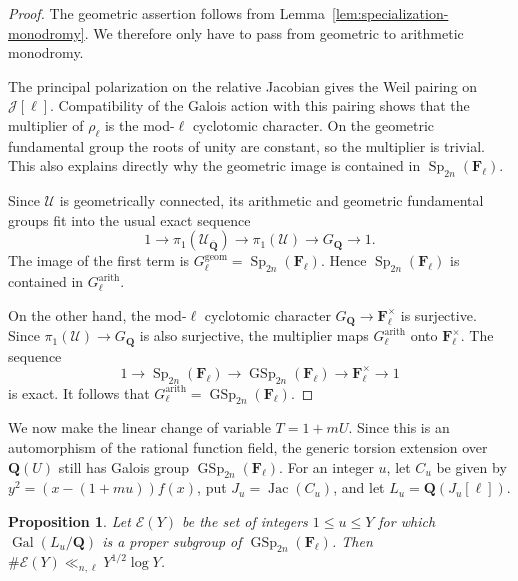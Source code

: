 \documentclass[11pt,hidelinks]{amsart}
\newtheorem{proposition}[theorem]{Proposition}
\newcommand{\Q}{\mathbf Q}
\newcommand{\F}{\mathbf F}
\newcommand{\Gal}{\operatorname{Gal}}
\newcommand{\GSp}{\operatorname{GSp}}
\newcommand{\Sp}{\operatorname{Sp}}
\newcommand{\Jac}{\operatorname{Jac}}
\begin{document}
\begin{proof}
The geometric assertion follows from
Lemma~\ref{lem:specialization-monodromy}.  We therefore only have to pass
from geometric to arithmetic monodromy.

The principal polarization on the relative Jacobian gives the Weil
pairing on $\mathcal J[\ell]$.  Compatibility of the Galois action
with this pairing shows that the multiplier of $\rho_\ell$ is the
mod-$\ell$ cyclotomic character.  On the geometric fundamental group
the roots of unity are constant, so the multiplier is trivial.  This
also explains directly why the geometric image is contained in
$\Sp_{2n}(\F_\ell)$.

Since $\mathcal U$ is geometrically connected, its arithmetic and
geometric fundamental groups fit into the usual exact sequence
\[
1\longrightarrow
\pi_1(\mathcal U_{\overline{\Q}})
\longrightarrow
\pi_1(\mathcal U)
\longrightarrow
G_\Q
\longrightarrow1.
\]
The image of the first term is
$G^{\mathrm{geom}}_\ell=\Sp_{2n}(\F_\ell)$.  Hence
$\Sp_{2n}(\F_\ell)$ is contained in
$G^{\mathrm{arith}}_\ell$.

On the other hand, the mod-$\ell$ cyclotomic character
$G_\Q\rightarrow\F_\ell^\times$ is surjective.  Since
$\pi_1(\mathcal U)\rightarrow G_\Q$ is also surjective, the multiplier
maps $G^{\mathrm{arith}}_\ell$ onto $\F_\ell^\times$. The 
sequence
\[
1\longrightarrow
\Sp_{2n}(\F_\ell)
\longrightarrow
\GSp_{2n}(\F_\ell)
\longrightarrow
\F_\ell^\times
\longrightarrow1
\]
is exact.  It follows that
$G^{\mathrm{arith}}_\ell=\GSp_{2n}(\F_\ell)$.
\end{proof}



We now make the linear change of variable $T=1+mU$. Since this is an automorphism of the rational function field, the generic torsion extension over $\Q(U)$ still has Galois group $\GSp_{2n}(\F_\ell)$. For an integer $u$, let $C_u$ be given by $y^2=(x-(1+mu))f(x)$, put $J_u=\Jac(C_u)$, and let $L_u=\Q(J_u[\ell])$.

\begin{proposition}\label{prop:HIT}
Let $\mathcal E(Y)$ be the set of integers $1\leq u\leq Y$ for which
$\Gal(L_u/\Q)$ is a proper subgroup of $\GSp_{2n}(\F_\ell)$. Then $\#\mathcal E(Y)\ll_{n,\ell}Y^{1/2}\log Y$.
\end{proposition}
\end{document}
